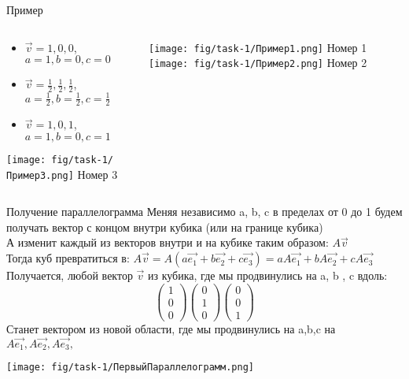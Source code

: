 
\begin{frame}{Пример}
\begin{columns}
\begin{column}{0.5\paperwidth}
\begin{itemize}
    \item $\vec{v} = {1,0,0}$, $a=1,b=0,c=0$
    \item $\vec{v} = {\frac{1}{2},\frac{1}{2},\frac{1}{2}}$, $a=\frac{1}{2},b=\frac{1}{2},c=\frac{1}{2}$
    \item $\vec{v} = {1,0,1}$, $a=1,b=0,c=1$
\end{itemize}
\begin{center}
\texttt{[image: fig/task-1/Пример3.png]}  
\small Номер 3
\end{center}
\end{column}
\begin{column}{0.3\paperwidth}
\texttt{[image: fig/task-1/Пример1.png]}
\small Номер 1
\texttt{[image: fig/task-1/Пример2.png]}
\small Номер 2
\end{column}
\end{columns}   
\end{frame}


\begin{frame}{Получение параллелограмма}
Меняя независимо a, b, c в пределах от 0 до 1 будем получать вектор с концом внутри кубика (или на границе кубика) \\
А изменит каждый из векторов внутри и на кубике таким образом: $A\vec{v}$ \\
Тогда куб превратиться в: $A\vec{v} = A(a\vec{e_{1}} + b\vec{e_{2}} +c\vec{e_{3}}) = aA\vec{e_{1}} + bA\vec{e_{2}} +cA\vec{e_{3}}$ \\
Получается, любой вектор $\vec{v}$ из кубика, где мы продвинулись на a, b , c вдоль:
\[
\left(\begin{array}{l}
    1 \\
    0 \\
    0
\end{array}\right)
\left(\begin{array}{l}
    0 \\
    1 \\
    0
\end{array}\right)
\left(\begin{array}{l}
    0 \\
    0 \\
    1
\end{array}\right)
\]
Станет вектором из новой области, где мы продвинулись на a,b,c на $A\vec{e_{1}}, A\vec{e_{2}},A\vec{e_{3}},$
\begin{center}
\texttt{[image: fig/task-1/ПервыйПараллелограмм.png]} 
\end{center}
\end{frame}

